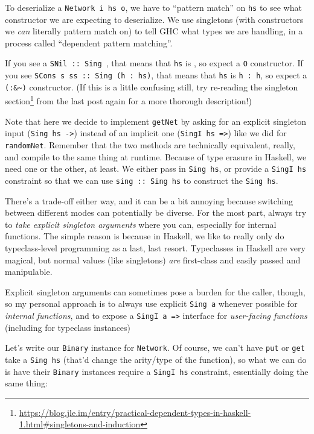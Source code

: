 \documentclass[]{article}
\renewcommand{\href}[2]{#2\footnote{\url{#1}}}
\begin{document}
To deserialize a \texttt{Network\ i\ hs\ o}, we have to ``pattern match'' on
\texttt{hs} to see what constructor we are expecting to deserialize. We use
singletons (with constructors we \emph{can} literally pattern match on) to tell
GHC what types we are handling, in a process called ``dependent pattern
matching''.

If you see a \texttt{SNil\ ::\ Sing\ \textquotesingle{}{[}{]}}, that means that
\texttt{hs} is \texttt{\textquotesingle{}{[}{]}}, so expect a \texttt{O}
constructor. If you see
\texttt{SCons\ s\ ss\ ::\ Sing\ (h\ \textquotesingle{}:\ hs)}, that means that
\texttt{hs} is \texttt{h\ \textquotesingle{}:\ h\textquotesingle{}}, so expect a
\texttt{(:\&\textasciitilde{})} constructor. (If this is a little confusing
still, try re-reading the
\href{https://blog.jle.im/entry/practical-dependent-types-in-haskell-1.html\#singletons-and-induction}{singleton
section} from the last post again for a more thorough description!)

Note that here we decide to implement \texttt{getNet} by asking for an explicit
singleton input (\texttt{Sing\ hs\ -\textgreater{}}) instead of an implicit one
(\texttt{SingI\ hs\ =\textgreater{}}) like we did for \texttt{randomNet}.
Remember that the two methods are technically equivalent, really, and compile to
the same thing at runtime. Because of type erasure in Haskell, we need one or
the other, at least. We either pass in \texttt{Sing\ hs}, or provide a
\texttt{SingI\ hs} constraint so that we can use \texttt{sing\ ::\ Sing\ hs} to
construct the \texttt{Sing\ hs}.

There's a trade-off either way, and it can be a bit annoying because switching
between different modes can potentially be diverse. For the most part, always
try to \emph{take explicit singleton arguments} where you can, especially for
internal functions. The simple reason is because in Haskell, we like to really
only do typeclass-level programming as a last, last resort. Typeclasses in
Haskell are very magical, but normal values (like singletons) \emph{are}
first-class and easily passed and manipulable.

Explicit singleton arguments can sometimes pose a burden for the caller, though,
so my personal approach is to always use explicit \texttt{Sing\ a} whenever
possible for \emph{internal functions}, and to expose a
\texttt{SingI\ a\ =\textgreater{}} interface for \emph{user-facing functions}
(including for typeclass instances)

Let's write our \texttt{Binary} instance for \texttt{Network}. Of course, we
can't have \texttt{put} or \texttt{get} take a \texttt{Sing\ hs} (that'd change
the arity/type of the function), so what we can do is have their \texttt{Binary}
instances require a \texttt{SingI\ hs} constraint, essentially doing the same
thing:
\end{document}
